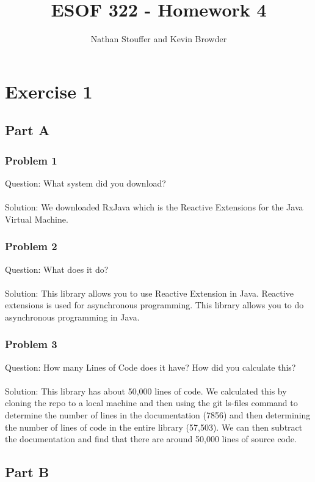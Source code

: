 \documentclass{article}
\begin{document}
	
\title{ESOF 322 - Homework 4}
\author{Nathan Stouffer and Kevin Browder}

\maketitle
\newpage

\section*{Exercise 1}

\subsection*{Part A}
\subsubsection*{Problem 1}
Question: What system did you download?\\\\
Solution: We downloaded RxJava which is the Reactive Extensions for the Java Virtual Machine.

\subsubsection*{Problem 2}
Question: What does it do?\\\\
Solution: This library allows you to use Reactive Extension in Java. Reactive extensions is used for asynchronous programming. This library allows you to do asynchronous programming in Java.

\subsubsection*{Problem 3}
Question: How many Lines of Code does it have? How did you calculate this?\\\\
Solution: This library has about 50,000 lines of code. We calculated this by cloning the repo to a local machine and then using the git ls-files command to determine the number of lines in the documentation (7856) and then determining the number of lines of code in the entire library (57,503). We can then subtract the documentation and find that there are around 50,000 lines of source code.

\subsection*{Part B}
\end{document}
